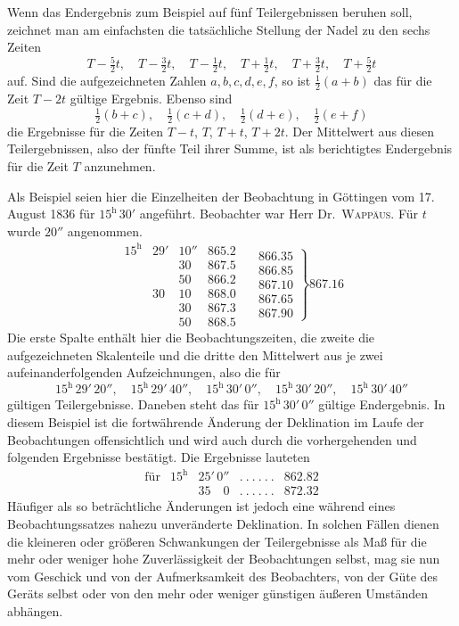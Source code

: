 Wenn das Endergebnis zum Beispiel auf fünf Teilergebnissen beruhen soll, zeichnet man am einfachsten die tatsächliche Stellung der Nadel zu den sechs Zeiten
\[
T-\tfrac52t,\quad T-\tfrac32t,\quad T-\tfrac12t,\quad T+\tfrac12t,\quad T+\tfrac32t,\quad T+\tfrac52t
\]
auf. Sind die aufgezeichneten Zahlen $a,b,c,d,e,f$, so ist $\tfrac12(a+b)$ das für die Zeit $T-2t$ gültige Ergebnis. Ebenso sind
\[
\tfrac12(b+c),\quad\tfrac12(c+d),\quad\tfrac12(d+e),\quad\tfrac12(e+f)
\]
die Ergebnisse für die Zeiten $T-t$, $T$, $T+t$, $T+2t$. Der Mittelwert aus diesen Teilergebnissen, also der fünfte Teil ihrer Summe, ist als berichtigtes Endergebnis für die Zeit $T$ anzunehmen.

Als Beispiel seien hier die Einzelheiten der Beobachtung in Göttingen vom 17. August 1836 für $15^{\mathrm h}\,30'$ angeführt. Beobachter war Herr Dr.~\textsc{Wappäus}. Für $t$ wurde $20''$ angenommen.
\[
\begin{array}{rrr|r|}
15^{\mathrm h}&29'&10''&865.2\\
&&30&867.5\\
&&50&866.2\\
&30&10&868.0\\
&&30&867.3\\
&&50&868.5
\end{array}
\quad
\left.\begin{array}{r}866.35\\866.85\\867.10\\867.65\\867.90\end{array}\right\}867.16
\]
Die erste Spalte enthält hier die Beobachtungszeiten, die zweite die aufgezeichneten Skalenteile und die dritte den Mittelwert aus je zwei aufeinanderfolgenden Aufzeichnungen, also die für
\[
15^{\mathrm h}\,29'\,20'',\quad15^{\mathrm h}\,29'\,40'',\quad15^{\mathrm h}\,30'\,0'',\quad15^{\mathrm h}\,30'\,20'',\quad15^{\mathrm h}\,30'\,40''
\]
gültigen Teilergebnisse. Daneben steht das für $15^{\mathrm h}\,30'\,0''$ gültige Endergebnis. In diesem Beispiel ist die fortwährende Änderung der Deklination im Laufe der Beobachtungen offensichtlich und wird auch durch die vorhergehenden und folgenden Ergebnisse bestätigt. Die Ergebnisse lauteten
\[
\begin{array}{lrrll}
\text{für}&15^{\mathrm h}&25'\,0''&.\ .\ .\ .\ .\ .&862.82\\
&&35\quad0&.\ .\ .\ .\ .\ .&872.32
\end{array}
\]
Häufiger als so beträchtliche Änderungen ist jedoch eine während eines Beobachtungssatzes nahezu unveränderte Deklination. In solchen Fällen dienen die kleineren oder größeren Schwankungen der Teilergebnisse als Maß für die mehr oder weniger hohe Zuverlässigkeit der Beobachtungen selbst, mag sie nun vom Geschick und von der Aufmerksamkeit des Beobachters, von der Güte des Geräts selbst oder von den mehr oder weniger günstigen äußeren Umständen abhängen.

